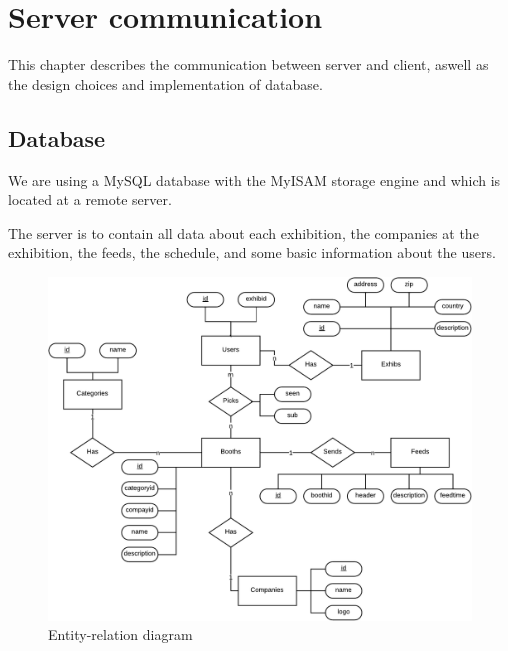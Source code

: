 \chapter{Server communication}
This chapter describes the communication between server and client, aswell as the design choices and implementation of database. 

\section{Database}
We are using a MySQL database with the MyISAM storage engine and which is located at a remote server. 

The server is to contain all data about each exhibition, the companies at the exhibition, the feeds, the schedule, and some basic information about the users.

\begin{figure}[H]
\centering
\includegraphics[page=1,width=1\linewidth]{img/sw7ERD.pdf}
\caption{Entity-relation diagram}
\label{fig:erd}
\end{figure}


